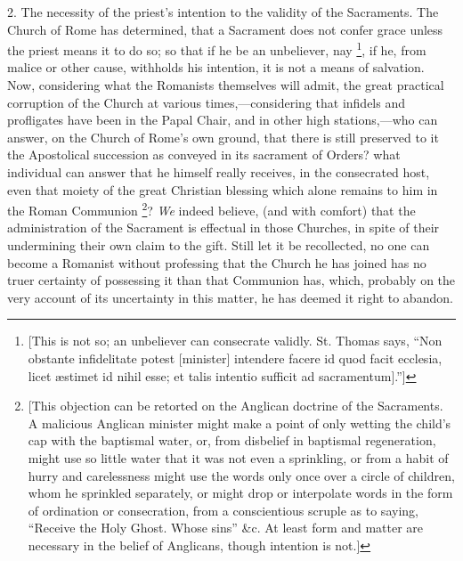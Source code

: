 2. The necessity of the priest's intention to the
validity of the Sacraments. The Church of Rome has determined, that a
Sacrament does not confer grace unless the priest means it to do
so; so that if he be an unbeliever, nay \footnote{[This is not so; an unbeliever can consecrate validly. St. Thomas
says, ``Non obstante infidelitate potest [minister] intendere facere id
quod facit ecclesia, licet æstimet id nihil esse; et talis intentio
sufficit ad sacramentum].'']}, if he, from malice or other cause, withholds his intention, it
is not a means of salvation. Now, considering what the Romanists
themselves will admit, the great practical corruption of the Church at
various times,—considering that infidels and profligates have been
in the Papal Chair, and in other high stations,—who can answer, on
the Church of Rome's own ground, that there is still preserved to it
the Apostolical succession as conveyed in its sacrament of Orders?
what individual can answer that he himself really receives, in the
consecrated host, even that moiety of the great Christian blessing
which alone remains to him in the Roman Communion \footnote{[This objection can be retorted on the Anglican doctrine of the
Sacraments. A malicious Anglican minister might make a point of only
wetting the child's cap with the baptismal water, or, from disbelief
in baptismal regeneration, might use so little water that it was not
even a sprinkling, or from a habit of hurry and carelessness might use
the words only once over a circle of children, whom he sprinkled
separately, or might drop or interpolate words in the form of
ordination or consecration, from a conscientious scruple as to saying,
``Receive the Holy Ghost. Whose sins'' \&c. At least form and matter
are necessary in the belief of Anglicans, though intention is not.]}? \emph{We} indeed believe, (and with comfort) that the
administration of the Sacrament is effectual in those Churches, in
spite of their undermining their own claim to the gift. Still let it
be recollected, no one can become a Romanist without professing that
the Church he has joined has no truer certainty of possessing it than
that Communion has, which, probably on the very account of its
uncertainty in this matter, he has deemed it right to abandon.

